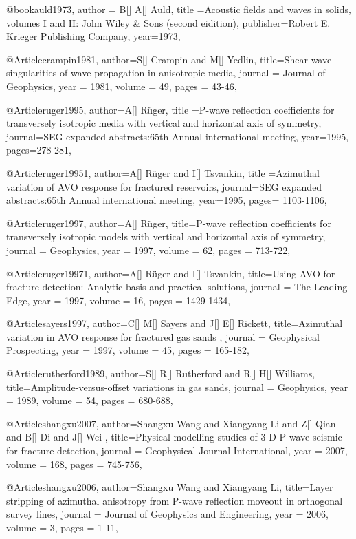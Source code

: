 @book{auld1973,
  author = {B[] A[] Auld},
  title ={Acoustic fields and waves in solids, volumes I and II: John Wiley \& Sons (second eidition)},
  publisher={Robert E. Krieger Publishing
Company},
  year=1973,
}

@Article{crampin1981,
  author={S[] Crampin and M[] Yedlin},
  title={Shear-wave singularities of wave propagation
in anisotropic media},
  journal = 	 {Journal of Geophysics},
  year = 	 1981,
  volume =	49,
  pages =	 {43-46},
}

@Article{ruger1995,
  author={A[] R\"{u}ger},
  title ={P-wave reflection coefficients for transversely isotropic media with vertical and horizontal axis of symmetry},
  journal={SEG expanded abstracts:65th Annual international meeting},
  year=1995,
  pages={278-281},
}


@Article{ruger19951,
  author={A[] R\"{u}ger and I[] Tsvankin},
  title ={Azimuthal variation of AVO response for fractured reservoirs},
  journal={SEG expanded abstracts:65th Annual international meeting},
  year=1995,
  pages={ 1103-1106},
}

@Article{ruger1997,
  author={A[] R\"{u}ger},
  title={P-wave reflection coefficients for transversely isotropic models with vertical and horizontal axis of symmetry},
  journal = 	 {Geophysics},
  year = 	 1997,
  volume =	 62,
  pages =	 {713-722},
}

@Article{ruger19971,
  author={A[] R\"{u}ger and I[] Tsvankin},
  title={Using AVO for fracture detection: Analytic basis and practical solutions},
  journal = 	 {The Leading Edge},
  year = 	 1997,
  volume =	16,
  pages =	 {1429-1434},
}


@Article{sayers1997,
  author={C[] M[] Sayers and J[] E[] Rickett},
  title={Azimuthal variation in AVO response for fractured gas sands
},
  journal = 	 {Geophysical Prospecting},
  year = 	 1997,
  volume =	45,
  pages =	 {165-182},
}

@Article{rutherford1989,
  author={S[] R[] Rutherford and R[] H[] Williams},
  title={Amplitude-versus-offset variations in gas sands},
  journal = 	 {Geophysics},
  year = 	 1989,
  volume =	54,
  pages =	 {680-688},
}

@Article{shangxu2007,
  author={Shangxu Wang and Xiangyang Li and Z[] Qian and B[] Di and J[] Wei },
  title={Physical modelling studies of 3-D P-wave seismic for fracture detection},
  journal = 	 {Geophysical Journal International},
  year = 	 2007,
  volume =	 168,
  pages =	 {745-756},
}

@Article{shangxu2006,
  author={Shangxu Wang and Xiangyang Li},
  title={Layer stripping of azimuthal anisotropy from P-wave reflection moveout in orthogonal survey lines},
  journal = 	 {Journal of Geophysics and Engineering},
  year = 	 2006,
  volume =	 3,
  pages =	 {1-11},
}

